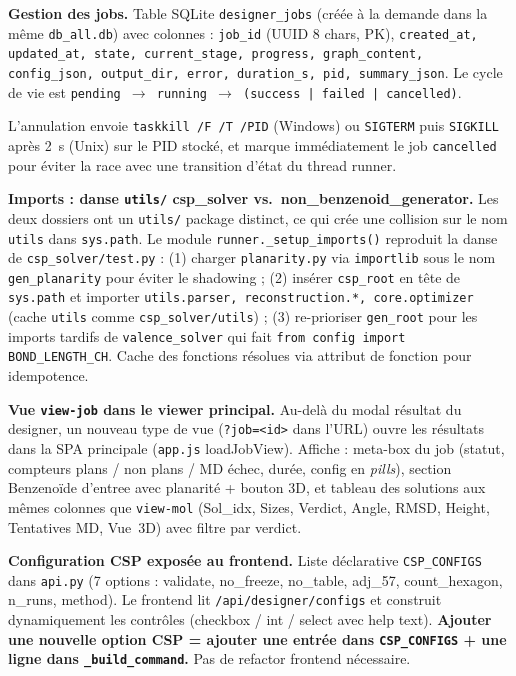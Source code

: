 \textbf{Gestion des jobs.} Table SQLite \texttt{designer\_jobs}
(créée à la demande dans la même \texttt{db\_all.db}) avec colonnes :
\texttt{job\_id} (UUID 8 chars, PK), \texttt{created\_at, updated\_at,
state, current\_stage, progress, graph\_content, config\_json,
output\_dir, error, duration\_s, pid, summary\_json}. Le cycle de vie
est \texttt{pending~$\to$~running~$\to$~(success | failed | cancelled)}.

L'annulation envoie \texttt{taskkill /F /T /PID} (Windows) ou
\texttt{SIGTERM} puis \texttt{SIGKILL} après 2~s (Unix) sur le PID
stocké, et marque immédiatement le job \texttt{cancelled} pour éviter
la race avec une transition d'état du thread runner.

\textbf{Imports : danse \texttt{utils/} csp\_solver vs.~non\_benzenoid\_generator.}
Les deux dossiers ont un \texttt{utils/} package distinct, ce qui crée
une collision sur le nom \texttt{utils} dans \texttt{sys.path}. Le
module \texttt{runner.\_setup\_imports()} reproduit la danse de
\texttt{csp\_solver/test.py} : (1) charger \texttt{planarity.py} via
\texttt{importlib} sous le nom \texttt{gen\_planarity} pour éviter le
shadowing ; (2) insérer \texttt{csp\_root} en tête de \texttt{sys.path}
et importer \texttt{utils.parser, reconstruction.*, core.optimizer}
(cache \texttt{utils} comme \texttt{csp\_solver/utils}) ; (3)
re-prioriser \texttt{gen\_root} pour les imports tardifs de
\texttt{valence\_solver} qui fait \texttt{from config import
BOND\_LENGTH\_CH}. Cache des fonctions résolues via attribut de
fonction pour idempotence.

\textbf{Vue \texttt{view-job} dans le viewer principal.} Au-delà du
modal résultat du designer, un nouveau type de vue (\texttt{?job=<id>}
dans l'URL) ouvre les résultats dans la SPA principale (\texttt{app.js}
loadJobView). Affiche : meta-box du job (statut, compteurs plans /
non plans / MD échec, durée, config en \emph{pills}), section
\og{}Benzenoïde d'entree\fg{} avec planarité + bouton 3D, et tableau
des solutions aux mêmes colonnes que \texttt{view-mol}
(Sol\_idx, Sizes, Verdict, Angle, RMSD, Height, Tentatives MD, Vue~3D)
avec filtre par verdict.

\textbf{Configuration CSP exposée au frontend.} Liste déclarative
\texttt{CSP\_CONFIGS} dans \texttt{api.py} (7 options : validate,
no\_freeze, no\_table, adj\_57, count\_hexagon, n\_runs, method).
Le frontend lit \texttt{/api/designer/configs} et construit
dynamiquement les contrôles (checkbox / int / select avec help text).
\textbf{Ajouter une nouvelle option CSP = ajouter une entrée dans
\texttt{CSP\_CONFIGS} + une ligne dans \texttt{\_build\_command}.}
Pas de refactor frontend nécessaire.

